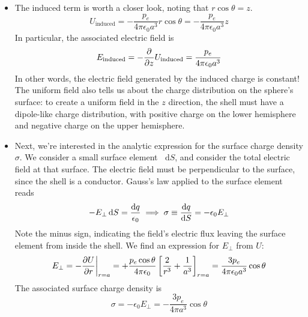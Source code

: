 \documentclass[11pt, a4paper]{article}
\newcommand{\diff}{\mathop{}\!\mathrm{d}} %
\newcommand{\ee}{\epsilon_{0}}  %
\begin{document}
\begin{itemize}
	\item The induced term is worth a closer look, noting that $ r\cos \theta = z $. 
	\begin{equation*}
		U_{\text{induced}} = -\frac{p_{e}}{4\pi \ee a^{3}}r\cos \theta = -\frac{p_{e}}{4\pi \ee a^{3}}z
	\end{equation*}
	In particular, the associated electric field is
	\begin{equation*}
		E_{\text{induced}} = -\pdv{z}U_{\text{induced}} = \frac{p_{e}}{4\pi \ee a^{3}}
	\end{equation*}
	In other words, the electric field generated by the induced charge is constant! The uniform field also tells us about the charge distribution on the sphere's surface: to create a uniform field in the $ z $ direction, the shell must have a dipole-like charge distribution, with positive charge on the lower hemisphere and negative charge on the upper hemisphere. 
	
	\item Next, we're interested in the analytic expression for the surface charge density $ \sigma $. We consider a small surface element $ \diff S $, and consider the total electric field at that surface. The electric field must be perpendicular to the surface, since the shell is a conductor. Gauss's law applied to the surface element reads
	\begin{equation*}
		- E_{\perp} \diff S = \frac{\diff q}{\ee} \implies \sigma \equiv \dv{q}{S} = -\ee E_{\perp}
	\end{equation*}
	Note the minus sign, indicating the field's electric flux leaving the surface element from inside the shell. We find an expression for $ E_{\perp} $ from $ U $:
	\begin{equation*}
		E_{\perp} = -\pdv{U}{r}\bigg|_{r = a} = + \frac{p_{e}\cos \theta}{4\pi \ee}\left[\frac{2}{r^{3}} + \frac{1}{a^{3}}\right]_{r = a} = \frac{3p_{e}}{4\pi \ee a^{3}} \cos \theta
	\end{equation*}
	The associated surface charge density is
	\begin{equation*}
		\sigma = -\ee E_{\perp} = -\frac{3p_{e}}{4\pi a^{3}} \cos \theta
	\end{equation*}
	
	
\end{itemize}
\end{document}
